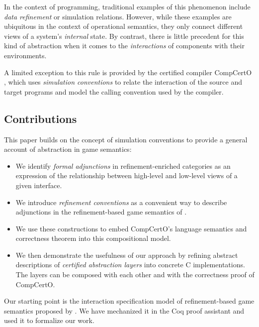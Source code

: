 \documentclass[sigplan,10pt,review,anonymous]{acmart}
\begin{document}

In the context of programming,
traditional examples of this phenomenon include
\emph{data refinement} \cite{dataref}
or simulation relations.
However,
while these examples
are ubiquitous in the context of operational semantics,
they only connect different views of
a system's \emph{internal} state.
%
By contrast,
there is little precedent
for this kind of abstraction
when it comes to the \emph{interactions} of
components with their environments.

A limited exception to this rule
is provided by the certified compiler CompCertO \cite{compcerto},
which uses \emph{simulation conventions}
to relate the interaction of the source and target programs
and model the calling convention used by the compiler.

\subsection{Contributions}

This paper builds on the concept of simulation conventions
to provide a general account of abstraction
in game semantics:
\begin{itemize}
  \item We identify \emph{formal adjunctions} in
    refinement-enriched categories
    as an expression of the relationship
    between high-level and low-level views
    of a given interface.
  \item We introduce \emph{refinement conventions}
    as a convenient way to describe adjunctions
    in the refinement-based game semantics of
    \citet{rbgs-cal}.
  \item We use these constructions to
    embed CompCertO's language semantics
    and correctness theorem into this
    compositional model.
  \item We then demonstrate the usefulness
    of our approach by refining abstract descriptions of
    \emph{certified abstraction layers}
    into concrete C implementations.
    The layers can be composed with each other
    and with the correctness proof of CompCertO.
\end{itemize}
Our starting point is
the interaction specification model
of refinement-based game semantics
proposed by \citet{rbgs-cal}.
We have mechanized it in the Coq proof assistant
and used it to formalize our work.
\end{document}
